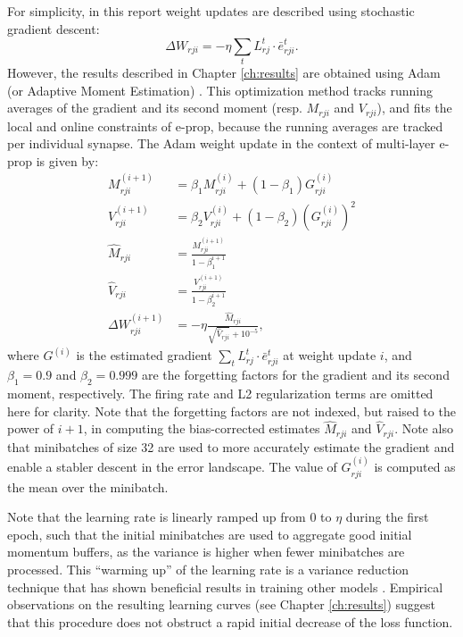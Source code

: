 	For simplicity, in this report weight updates are described using stochastic gradient descent:
	\begin{equation}
		\Delta W_{rji} = -\eta \sum_t L^t_{rj}\cdot\bar{e}^t_{rji}.
	\end{equation}
	However, the results described in Chapter \ref{ch:results} are obtained using Adam (or Adaptive Moment Estimation) \citep{kingma2014adam}.
	This optimization method tracks running averages of the gradient and its second moment (resp. $M_{rji}$ and $V_{rji}$), and fits the local and online constraints of e-prop, because the running averages are tracked per individual synapse.
	The Adam weight update in the context of multi-layer e-prop is given by:
	\begin{align}
	M_{rji}^{(i+1)} &= \beta_1 M_{rji}^{(i)} + \left(1 - \beta_1\right)G^{(i)}_{rji} \\
	V_{rji}^{(i+1)} &= \beta_2 V_{rji}^{(i)} + \left(1 - \beta_2\right)\left(G^{(i)}_{rji}\right)^2 \\
	\widehat{M}_{rji} &= \frac{M_{rji}^{(i+1)}}{1 - \beta_1^{i+1}} \\
	\widehat{V}_{rji} &= \frac{V_{rji}^{(i+1)}}{1 - \beta_2^{i+1}} \\
	\Delta W_{rji}^{(i+1)} &= -\eta \frac{\widehat{M}_{rji}}{\sqrt{\widehat{V}_{rji}} + 10^{-5}},
	\end{align}
	where $G^{(i)}$ is the estimated gradient $\sum_t L^t_{rj}\cdot\bar{e}^t_{rji}$ at weight update $i$, and $\beta_1=0.9$ and $\beta_2=0.999$ are the forgetting factors for the gradient and its second moment, respectively.
	The firing rate and L2 regularization terms are omitted here for clarity.
	Note that the forgetting factors are not indexed, but raised to the power of $i+1$, in computing the bias-corrected estimates $\widehat{M}_{rji}$ and $\widehat{V}_{rji}$.
	Note also that minibatches of size 32 are used to more accurately estimate the gradient and enable a stabler descent in the error landscape.
	The value of $G^{(i)}_{rji}$ is computed as the mean over the minibatch.

	Note that the learning rate is linearly ramped up from 0 to $\eta$ during the first epoch, such that the initial minibatches are used to aggregate good initial momentum buffers, as the variance is higher when fewer minibatches are processed.
	This ``warming up'' of the learning rate is a variance reduction technique that has shown beneficial results in training other models \citep{liu2019variance}.
	Empirical observations on the resulting learning curves (see Chapter \ref{ch:results}) suggest that this procedure does not obstruct a rapid initial decrease of the loss function.
